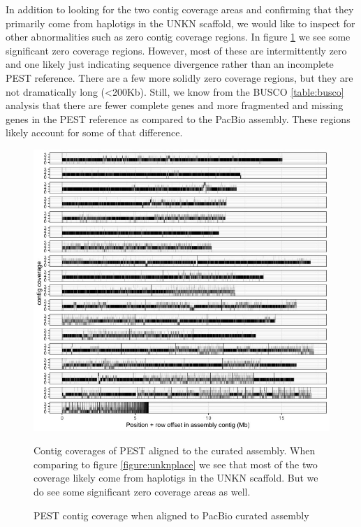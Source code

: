 \par{
In addition to looking for the two contig coverage areas and confirming that they primarily come from haplotigs in the UNKN scaffold, we would like to inspect for other abnormalities such as zero contig coverage regions. In figure \ref{figure:reverse_coverage} we see some significant zero coverage regions. However, most of these are intermittently zero and one likely just indicating sequence divergence rather than an incomplete PEST reference. There are a few more solidly zero coverage regions, but they are not dramatically long (<200Kb). Still, we know from the BUSCO \ref{table:busco} analysis that there are fewer complete genes and more fragmented and missing genes in the PEST reference as compared to the PacBio assembly. These regions likely account for some of that difference.
}

\begin{figure}[htbp!]

\caption{PEST contig coverage when aligned to PacBio curated assembly}
\label{figure:reverse_coverage}
\begin{centering}
\includegraphics[width=1.0\textwidth]{Reverse_contig_coverage.jpeg}
\par{Contig coverages of PEST aligned to the curated assembly. When comparing to figure \ref{figure:unknplace} we see that most of the two coverage likely come from haplotigs in the UNKN scaffold. But we do see some significant zero coverage areas as well.}
\end{centering}
\end{figure}

